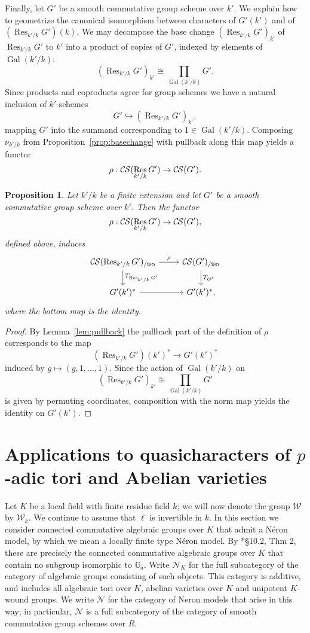 \documentclass[10pt]{amsart}
\theoremstyle{plain}
\newtheorem{proposition}[theorem]{Proposition}
\theoremstyle{definition}
\theoremstyle{remark}
\newcommand{\Fq}{k}
\newcommand{\Weil}[1]{\mathcal{W}_{#1}}
\DeclareMathOperator{\Gal}{Gal}
\DeclareMathOperator{\Res}{Res}
\newcommand{\TrFrob}[1]{T_{#1}}
\newcommand{\CS}{{\mathcal{C\hskip-0.8pt S}}}
\newcommand{\CSiso}[1]{\CS(#1)_{/\text{iso}}}
\begin{document}
Finally, let $G'$ be a smooth commutative group scheme over $k'$.
We explain how to geometrize the canonical isomorphism between characters of $G'(k')$ and of $(\Res_{k'/k}G')(k)$.
We may decompose the base change $(\Res_{k'/k}G')_{k'}$ of $\Res_{k'/k}G'$ to $k'$
into a product of copies of $G'$, indexed by elements of $\Gal(k'/k)$:
\[
(\Res_{k'/k}G')_{k'} \cong \prod_{\Gal(k'/k)} G'.
\]
Since products and coproducts agree for group schemes we have a natural inclusion of $k'$-schemes
\[
G' \hookrightarrow (\Res_{k'/k}G')_{k'},
\]
mapping $G'$ into the summand corresponding to $1 \in \Gal(k'/k)$.  Composing $\nu_{k'/k}$
from Proposition~\ref{prop:basechange} with pullback along this map yields a functor
\[
\rho : \CS(\Res_{k'/k}G') \to \CS(G').
\]

\begin{proposition}
Let $k'/k$ be a finite extension and let $G'$ be a smooth commutative group scheme over $k'$.
Then the functor 
\[
\rho : \CS(\Res_{k'/k}G') \to \CS(G'),
\]
defined above, induces
\[
\begin{tikzcd}
\CSiso{\Res_{k'/k} G'} \dar{\TrFrob{\Res_{k'/k} G'}} \rar{\rho} & \CSiso{G'} \dar{\TrFrob{G'}}\\
G'(k')^* \rar & G'(k')^*,
\end{tikzcd}
\]
where the bottom map is the identity.
\end{proposition}
\begin{proof}
By Lemma~\ref{lem:pullback} the pullback part of the definition of $\rho$ corresponds to the map
\[
(\Res_{k'/k}G')(k')^* \to G'(k')^*
\]
induced by $g \mapsto (g, 1, \ldots, 1)$.  Since the action of $\Gal(k'/k)$ on
\[
(\Res_{k'/k}G')_{k'} \cong \prod_{\Gal(k'/k)} G'
\]
is given by permuting coordinates, composition with the norm map yields the identity on $G'(k')$.
\end{proof}


\section{Applications to quasicharacters of $p$-adic tori and Abelian varieties}\label{sec:applications}

Let $K$ be a local field with finite residue field $\Fq$; we will now denote the group $\Weil{}$ by $\Weil{\Fq}$.
We continue to assume that $\ell$ is invertible in $\Fq$. 
In this section we consider connected commutative algebraic groups over $K$ that admit a N\'eron model, by which we mean a locally finite type N\'eron model.
By \cite{bosch-lutkebohmert-reynaud:NeronModels}*{\S 10.2, Thm 2}, these are precisely the connected commutative algebraic groups over $K$ that contain no subgroup isomorphic to $\mathbb{G}_\text{a}$.
Write $\mathcal{N}_K$ for the full subcategory of the category of algebraic groups consisting of such objects.  This category is additive, and includes all algebraic tori over $K$, abelian varieties over $K$ and unipotent $K$-wound groups.
We write $\mathcal{N}$ for the category of Neron models that arise in this way; in particular, $\mathcal{N}$ is a full subcategory of the category of smooth commutative group schemes over $R$.
\end{document}

